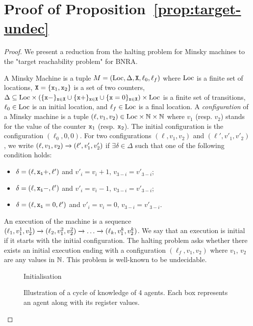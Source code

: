 \section{Proof of Proposition~\ref{prop:target-undec}}

\propTargetUndecidable*

\begin{proof}
	We present a reduction from the halting problem for Minsky machines to the "target reachability problem" for BNRA.
	
	A Minsky Machine is a tuple $M= (\text{Loc}, \Delta, \mathtt{X}, \ell_0, \ell_f)$ where $\text{Loc}$ is a finite set of locations, $\mathtt{X} = \{\mathtt{x}_1, \mathtt{x}_2\}$ is a set of two counters, $\Delta \subseteq \text{Loc} \times (\{\mathtt{\mathtt{x}}-\}_{\mathtt{x} \in \mathtt{X}} \cup \{\mathtt{\mathtt{x}}+\}_{\mathtt{x} \in \mathtt{X}} \cup \{\mathtt{\mathtt{x}}=0\}_{\mathtt{x} \in \mathtt{X}} ) \times \text{Loc}$ is a finite set of transitions, $\ell_0 \in \text{Loc}$ is an initial location, and $\ell_f \in \text{Loc}$ is a final location. A \emph{configuration} of a Minsky machine is a tuple $(\ell, v_1, v_2) \in \text{Loc} \times \mathbb{N} \times \mathbb{N}$ where $v_1$ (resp. $v_2$) stands for the value of the counter $\mathtt{x}_1$ (resp. $\mathtt{x}_2$). The initial configuration is the configuration $(\ell_0, 0, 0)$.
	For two configurations $(\ell, v_1, v_2)$ and  $(\ell', v'_1, v'_2)$, we write $(\ell, v_1, v_2) \xrightarrow{} (\ell', v'_1, v'_2)$ if $\exists \delta \in \Delta$ such that one of the following condition holds:
	\begin{itemize}
		\item $\delta = (\ell, \mathtt{\mathtt{x}_i}+, \ell')$ and $v'_i = v_i+1$, $v_{3-i} = v'_{3-i}$;
		\item $\delta = (\ell, \mathtt{\mathtt{x}_i}-, \ell')$ and $v'_i = v_i-1$, $v_{3-i} = v'_{3-i}$;
		\item $\delta = (\ell, \mathtt{\mathtt{x}_i}=0, \ell')$ and $v'_i = v_i = 0$, $v_{3-i} = v'_{3-i}$.
	\end{itemize}
	An execution of the machine is a sequence $(\ell_1, v_1^1, v_2^1) \xrightarrow{} (\ell_2, v_1^2, v_2^2) \xrightarrow{} \dots \xrightarrow{} (\ell_k, v_1^k, v_2^k)$. We say that an execution is initial if it starts with the initial configuration.
	The halting problem asks whether there exists an initial execution ending with a configuration $(\ell_f, v_1, v_2)$ where $v_1$, $v_2$ are any values in $\mathbb{N}$. This problem is well-known to be undecidable.
	
	
	\begin{figure}
	
	\caption{Initialisation}\label{fig:target-init}
\end{figure}
	\begin{figure}
		
		\caption{Illustration of a cycle of knowledge of 4 agents. Each box represents an agent along with its register values.}\label{fig:target-cycle-knowledge}
	\end{figure}
	


\end{proof}
